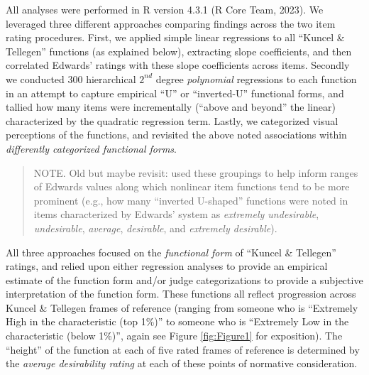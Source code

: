 \documentclass[
  ,jou]{apa6}
\begin{document}
All analyses were performed in R version 4.3.1 (R Core Team, 2023). We leveraged three different approaches comparing findings across the two item rating procedures. First, we applied simple linear regressions to all ``Kuncel \& Tellegen'' functions (as explained below), extracting slope coefficients, and then correlated Edwards' ratings with these slope coefficients across items. Secondly we conducted 300 hierarchical \(2^{nd}\) degree \emph{polynomial} regressions to each function in an attempt to capture empirical ``U'' or ``inverted-U'' functional forms, and tallied how many items were incrementally (``above and beyond'' the linear) characterized by the quadratic regression term. Lastly, we categorized visual perceptions of the functions, and revisited the above noted associations within \emph{differently categorized functional forms}.

\begin{quote}
NOTE. Old but maybe revisit: used these groupings to help inform ranges of Edwards values along which nonlinear item functions tend to be more prominent (e.g., how many ``inverted U-shaped'' functions were noted in items characterized by Edwards' system as \emph{extremely undesirable}, \emph{undesirable}, \emph{average}, \emph{desirable}, and \emph{extremely desirable}).
\end{quote}

All three approaches focused on the \emph{functional form} of ``Kuncel \& Tellegen'' ratings, and relied upon either regression analyses to provide an empirical estimate of the function form and/or judge categorizations to provide a subjective interpretation of the function form. These functions all reflect progression across Kuncel \& Tellegen frames of reference (ranging from someone who is ``Extremely High in the characteristic (top 1\%)'' to someone who is ``Extremely Low in the characteristic (below 1\%)'', again see Figure \ref{fig:Figure1} for exposition). The ``height'' of the function at each of five rated frames of reference is determined by the \emph{average desirability rating} at each of these points of normative consideration.
\end{document}

